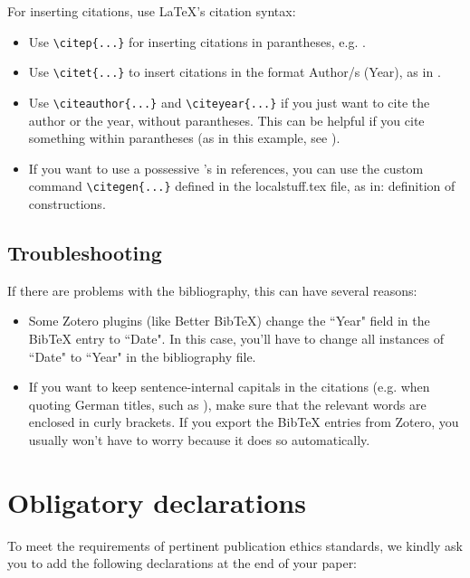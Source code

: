 For inserting citations, use \LaTeX's citation syntax:

\begin{itemize}
    \item Use \verb!\citep{...}! for inserting citations in parantheses, e.g. \citep{Example2}.
    \item Use \verb!\citet{...}! to insert citations in the format Author/s (Year), as in \citet{Example2}.
    \item Use \verb!\citeauthor{...}! and \verb!\citeyear{...}! if you just want to cite the author or the year, without parantheses. This can be helpful if you cite something within parantheses (as in this example, see \citeauthor{Example1} \citeyear{Example1}).
    \item If you want to use a possessive 's in references, you can use the custom command \verb!\citegen{...}! defined in the localstuff.tex file, as in:  definition of constructions.
\end{itemize}

\subsection*{Troubleshooting}

If there are problems with the bibliography, this can have several reasons:

\begin{itemize}
    \item Some Zotero plugins (like Better BibTeX) change the ``Year" field in the BibTeX entry to ``Date". In this case, you'll have to change all instances of ``Date" to ``Year" in the bibliography file.
    \item If you want to keep sentence-internal capitals in the citations (e.g. when quoting German titles, such as \citeauthor{Example3} \citeyear{Example3}), make sure that the relevant words are enclosed in curly brackets. If you export the BibTeX entries from Zotero, you usually won't have to worry because it does so automatically.
\end{itemize}

\section*{Obligatory declarations}

To meet the requirements of pertinent publication ethics standards, we kindly ask you to add the following declarations at the end of your paper:

